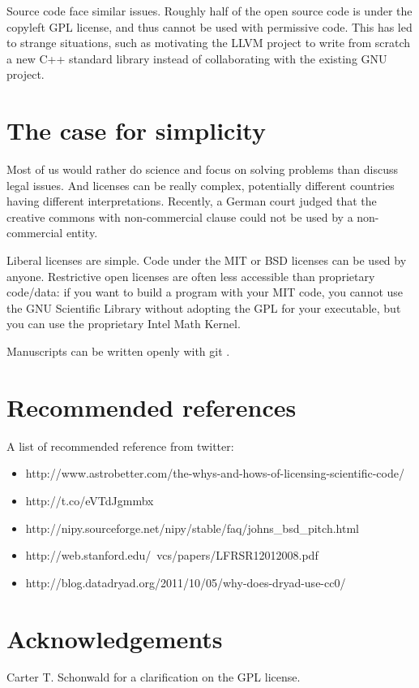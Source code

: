 \documentclass[letterpaper]{article}
\begin{document}
Source code face similar issues. Roughly half of the open source code is
under the copyleft GPL license, and thus cannot be used with permissive
code. This has led to strange situations, such as motivating the LLVM project
to write from scratch a new C++ standard library instead of collaborating
with the existing GNU project.


\section{The case for simplicity}

Most of us would rather do science and focus on solving problems than discuss
legal issues.  And licenses can be really complex, potentially different
countries having different interpretations. Recently, a German court judged
that the creative commons with non-commercial clause could not be used by
a non-commercial entity. %

Liberal licenses are simple. Code under the MIT or BSD licenses can be used by
anyone. Restrictive open licenses are often less accessible than proprietary
code/data: if you want to build a program with your MIT code, you cannot use
the GNU Scientific Library without adopting the GPL for your executable, but
you can use the proprietary Intel Math Kernel.

Manuscripts can be written openly with git \cite{ram13}.

\section{Recommended references}
A list of recommended reference from twitter:
\begin{itemize}
\item http://www.astrobetter.com/the-whys-and-hows-of-licensing-scientific-code/
\item http://t.co/eVTdJgmmbx
\item http://nipy.sourceforge.net/nipy/stable/faq/johns_bsd_pitch.html
\item http://web.stanford.edu/~vcs/papers/LFRSR12012008.pdf
\item http://blog.datadryad.org/2011/10/05/why-does-dryad-use-cc0/

\end{itemize}

\section{Acknowledgements}

Carter T. Schonwald for a clarification on the GPL license.



\end{document}
